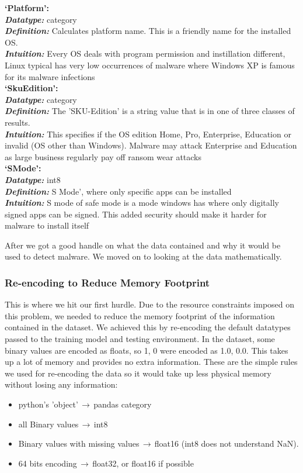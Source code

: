 \documentclass[sigconf]{acmart}
\begin{document}
\begin{center}
    \textbf{`Platform':\\}
    \textbf{\textit{Datatype: }}category\\
    \textbf{\textit{Definition: }} Calculates platform name. This is a friendly name for the installed OS.\\
    \textbf{\textit{Intuition: }}Every OS deals with program permission and instillation different, Linux typical has very low occurrences of malware where Windows XP is famous for its malware infections\\
    \vspace{5mm}
    \textbf{`SkuEdition':\\}
    \textbf{\textit{Datatype: }}category\\
    \textbf{\textit{Definition: }}The ’SKU-Edition’ is a string value that is in one of three classes of results. \\
    \textbf{\textit{Intuition: }}This specifies if the OS edition Home, Pro, Enterprise, Education or invalid (OS other than Windows). Malware may attack Enterprise and Education as large business regularly pay off ransom wear attacks\\
    \vspace{5mm}
    \textbf{`SMode':\\}
    \textbf{\textit{Datatype: }}int8\\
    \textbf{\textit{Definition: }}S Mode’, where only specific apps can be installed \\
    \textbf{\textit{Intuition: }}S mode of safe mode is a mode windows has where only digitally signed apps can be signed. This added security should make it harder for malware to install itself\\
    \vspace{5mm}
\end{center}
After we got a good handle on what the data contained and why it would be used to detect malware. We moved on to looking at the data mathematically. 
\subsubsection{Re-encoding to Reduce Memory Footprint}
This is where we hit our first hurdle. Due to the resource constraints imposed on this problem, we needed to reduce the memory footprint of the information contained in the dataset. We achieved this by re-encoding the default datatypes passed to the training model and testing environment. In the dataset, some binary values are encoded as floats, so 1, 0 were encoded as 1.0, 0.0. This takes up a lot of memory and provides no extra information. These are the simple rules we used for re-encoding the data so it would take up less physical memory without losing any information:
\begin{itemize}
\item python's 'object'$\,\to\,$pandas category
\item all Binary values$\,\to\,$int8
\item Binary values with missing values$\,\to\,$float16 (int8 does not understand NaN).
\item 64 bits encoding$\,\to\,$float32, or float16 if possible
\end{itemize}
\end{document}
